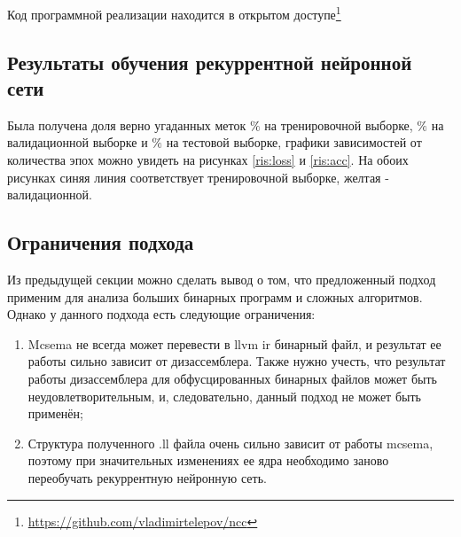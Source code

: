 Код программной реализации находится в открытом доступе\footnote{\url{https://github.com/vladimirtelepov/ncc}}

\subsection{Результаты обучения рекуррентной нейронной сети}
Была получена доля верно угаданных меток $\%$ на тренировочной выборке, $\%$ на валидационной выборке и $\%$ на тестовой выборке, графики зависимостей от количества эпох можно увидеть на рисунках \ref{ris:loss} и \ref{ris:acc}. На обоих рисунках синяя линия соответствует тренировочной выборке, желтая - валидационной.

\subsection{Ограничения подхода}
Из предыдущей секции можно сделать вывод о том, что предложенный подход применим для анализа больших бинарных программ и сложных алгоритмов. Однако у данного подхода есть следующие ограничения:
\begin{enumerate}
    \item Mcsema не всегда может перевести в llvm ir бинарный файл, и результат ее работы сильно зависит от дизассемблера. Также нужно учесть, что результат работы дизассемблера для обфусцированных бинарных файлов может быть неудовлетворительным, и, следовательно, данный подход не может быть применён;
    \item Структура полученного .ll файла очень сильно зависит от работы mcsema, поэтому при значительных изменениях ее ядра необходимо заново переобучать рекуррентную нейронную сеть.
\end{enumerate}
\newpage